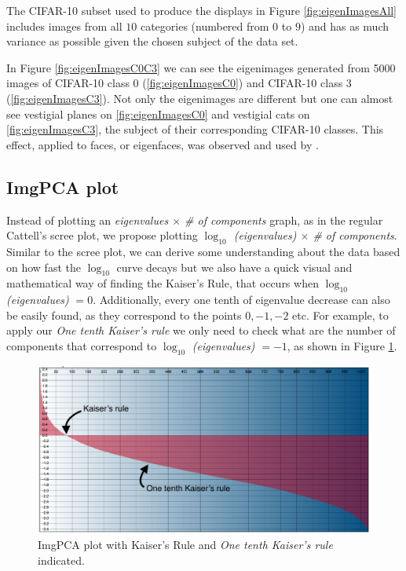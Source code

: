 \documentclass{article} %
\begin{document}
The CIFAR-10 subset used to produce the displays in Figure \ref{fig:eigenImagesAll} includes images from all $10$ categories (numbered from $0$ to $9$) and has as much variance as possible given the chosen subject of the data set.\par In Figure \ref{fig:eigenImagesC0C3} we can see the eigenimages generated from 5000 images of CIFAR-10 class 0 (\ref{fig:eigenImagesC0}) and CIFAR-10 class 3 (\ref{fig:eigenImagesC3}). Not only the eigenimages are different but one can almost see vestigial planes on \ref{fig:eigenImagesC0} and vestigial cats on \ref{fig:eigenImagesC3}, the subject of their corresponding CIFAR-10 classes.
This effect, applied to faces, or eigenfaces, was observed and used by \citet{sirovich1987low}.

\subsection{ImgPCA plot}
Instead of plotting an \textit{eigenvalues $\times$  \# of components} graph, as in the regular Cattell's scree plot, we propose plotting \textit{$\log_{10}$ (eigenvalues) $\times$ \# of components}. Similar to the scree plot, we can derive some understanding about the data based on how fast the $\log_{10}$ curve decays but we also have a quick visual and mathematical way of finding the Kaiser's Rule, that occurs when $\log_{10}$ \emph{(eigenvalues)} $= 0$. Additionally, every one tenth of eigenvalue decrease can also be easily found, as they correspond to the points $0, -1, -2$ etc. For example, to apply our \emph{One tenth Kaiser's rule} we only need to check what are the number of components that correspond to $\log_{10}$ \emph{(eigenvalues)} $= -1$, as shown in Figure \ref{fig:ImgPCAKaiserAndOTK}.

\begin{figure}[h]
\begin{center}
\includegraphics[width=\textwidth]{imgPcaKaiserRule.png}
\end{center}
\caption{ImgPCA plot with Kaiser's Rule and \emph{One tenth Kaiser's rule} indicated.}
\label{fig:ImgPCAKaiserAndOTK}
\end{figure}
\end{document}
